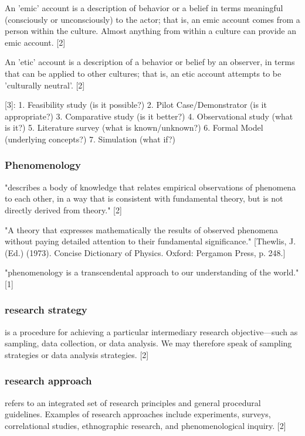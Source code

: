 An 'emic' account is a description of behavior or a belief in terms meaningful (consciously or unconsciously) to the actor; that is, an emic account comes from a person within the culture. Almost anything from within a culture can provide an emic account. [2]

An 'etic' account is a description of a behavior or belief by an observer, in terms that can be applied to other cultures; that is, an etic account attempts to be 'culturally neutral'. [2]

[3]:
1.	Feasibility study (is it possible?)
2.	Pilot Case/Demonstrator (is it appropriate?)
3.	Comparative study (is it better?)
4.	Observational study (what is it?)
5.	Literature survey (what is known/unknown?)
6.	Formal Model (underlying concepts?)
7.	Simulation (what if?)

\subsubsection{Phenomenology}

"describes a body of knowledge that relates empirical observations of phenomena to each other, in a way that is consistent with fundamental theory, but is not directly derived from theory." [2]

"A theory that expresses mathematically the results of observed phenomena without paying detailed attention to their fundamental significance." [Thewlis, J. (Ed.) (1973). Concise Dictionary of Physics. Oxford: Pergamon Press, p. 248.]

"phenomenology is a transcendental approach to our understanding of the world." [1]

\subsubsection{research strategy}
 is a procedure for achieving a particular intermediary research objective—such as sampling, data collection, or data analysis. We may therefore speak of sampling strategies or data analysis strategies. [2]

\subsubsection{research approach}
 refers to an integrated set of research principles and general procedural guidelines. Examples of research approaches include experiments, surveys, correlational studies, ethnographic research, and phenomenological inquiry. [2]

